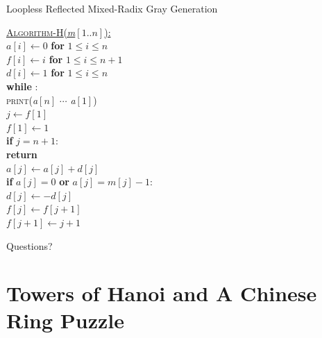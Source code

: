 \documentclass[aspectratio=169]{beamer}
\begin{document}
\begin{frame}{Loopless Reflected Mixed-Radix Gray Generation}
    \begin{nalgo}
    \underline{\textsc{Algorithm-H}(\emph{m}$[1..n]$):}
    \\\label{}  $a[i] \gets 0$ \textbf{for} $1 \leq i \leq n$
    \\\label{}  $f[i] \gets i$ \textbf{for} $1 \leq i \leq n + 1$
    \\\label{}  $d[i] \gets 1$ \textbf{for} $1 \leq i \leq n$ 
    \\\label{}  \textbf{while} \true:\+
    \\\label{}      \textsc{print}(\emph{a}$[n]$ $\cdots$ \emph{a}$[1]$)
    \\\label{}      $j \gets f[1]$
    \\\label{}      $f[1] \gets 1$
    \\\label{}      \textbf{if} $j = n + 1$:\+
    \\\label{}          \textbf{return}\-
    \\\label{}      $a[j] \gets a[j] + d[j]$
    \\\label{}      \textbf{if} $a[j] = 0$ \textbf{or} $a[j] = m[j] - 1$:\+
    \\\label{}           $d[j] \gets -d[j]$ 
    \\\label{}          $f[j] \gets f[j + 1]$
    \\\label{}          $f[j + 1] \gets j + 1$
    \end{nalgo}
\end{frame}

\begin{frame}{}
      \begin{center}
    {\color{sigma@mainblue} \LARGE Questions?}
  \end{center}
\end{frame}

\section{Towers of Hanoi and A Chinese Ring Puzzle}
\frame{\sectionpage}
\end{document}
